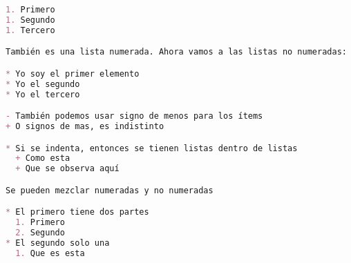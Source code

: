 \documentclass[12pt, addpoints]{../../common/epyl_exam_template}
\begin{document}
\begin{lstlisting}[language=markdown]
1. Primero
1. Segundo
1. Tercero

También es una lista numerada. Ahora vamos a las listas no numeradas:

* Yo soy el primer elemento
* Yo el segundo
* Yo el tercero

- También podemos usar signo de menos para los ítems
+ O signos de mas, es indistinto

* Si se indenta, entonces se tienen listas dentro de listas
  + Como esta
  + Que se observa aquí

Se pueden mezclar numeradas y no numeradas

* El primero tiene dos partes
  1. Primero
  2. Segundo
* El segundo solo una
  1. Que es esta
    \end{lstlisting}
\end{document}
